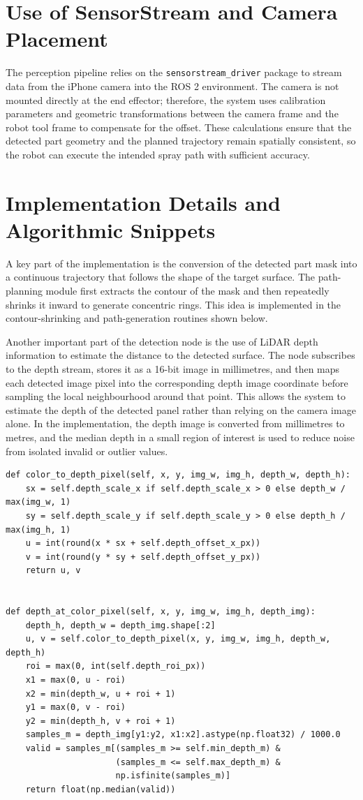 \section{Use of SensorStream and Camera Placement}
The perception pipeline relies on the \texttt{sensorstream\_driver} package to stream data from the iPhone camera into the ROS 2 environment. The camera is not mounted directly at the end effector; therefore, the system uses calibration parameters and geometric transformations between the camera frame and the robot tool frame to compensate for the offset. These calculations ensure that the detected part geometry and the planned trajectory remain spatially consistent, so the robot can execute the intended spray path with sufficient accuracy.

\section{Implementation Details and Algorithmic Snippets}
A key part of the implementation is the conversion of the detected part mask into a continuous trajectory that follows the shape of the target surface. The path-planning module first extracts the contour of the mask and then repeatedly shrinks it inward to generate concentric rings. This idea is implemented in the contour-shrinking and path-generation routines shown below.

Another important part of the detection node is the use of LiDAR depth information to estimate the distance to the detected surface. The node subscribes to the depth stream, stores it as a 16-bit image in millimetres, and then maps each detected image pixel into the corresponding depth image coordinate before sampling the local neighbourhood around that point. This allows the system to estimate the depth of the detected panel rather than relying on the camera image alone. In the implementation, the depth image is converted from millimetres to metres, and the median depth in a small region of interest is used to reduce noise from isolated invalid or outlier values.

\begin{verbatim}
def color_to_depth_pixel(self, x, y, img_w, img_h, depth_w, depth_h):
    sx = self.depth_scale_x if self.depth_scale_x > 0 else depth_w / max(img_w, 1)
    sy = self.depth_scale_y if self.depth_scale_y > 0 else depth_h / max(img_h, 1)
    u = int(round(x * sx + self.depth_offset_x_px))
    v = int(round(y * sy + self.depth_offset_y_px))
    return u, v


def depth_at_color_pixel(self, x, y, img_w, img_h, depth_img):
    depth_h, depth_w = depth_img.shape[:2]
    u, v = self.color_to_depth_pixel(x, y, img_w, img_h, depth_w, depth_h)
    roi = max(0, int(self.depth_roi_px))
    x1 = max(0, u - roi)
    x2 = min(depth_w, u + roi + 1)
    y1 = max(0, v - roi)
    y2 = min(depth_h, v + roi + 1)
    samples_m = depth_img[y1:y2, x1:x2].astype(np.float32) / 1000.0
    valid = samples_m[(samples_m >= self.min_depth_m) &
                      (samples_m <= self.max_depth_m) &
                      np.isfinite(samples_m)]
    return float(np.median(valid))
\end{verbatim}

